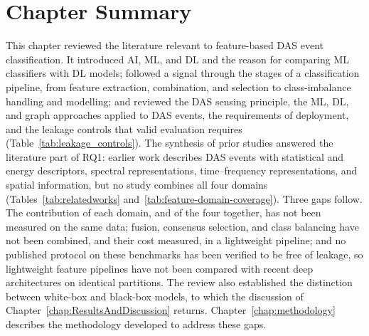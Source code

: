 \section{Chapter Summary}
\label{sec:chap2Summary}
This chapter reviewed the literature relevant to feature-based DAS event classification. It introduced AI, ML, and DL and the reason for comparing ML classifiers with DL models; followed a signal through the stages of a classification pipeline, from feature extraction, combination, and selection to class-imbalance handling and modelling; and reviewed the DAS sensing principle, the ML, DL, and graph approaches applied to DAS events, the requirements of deployment, and the leakage controls that valid evaluation requires (Table~\ref{tab:leakage_controls}). The synthesis of prior studies answered the literature part of RQ1: earlier work describes DAS events with statistical and energy descriptors, spectral representations, time--frequency representations, and spatial information, but no study combines all four domains (Tables~\ref{tab:relatedworks} and~\ref{tab:feature-domain-coverage}). Three gaps follow. The contribution of each domain, and of the four together, has not been measured on the same data; fusion, consensus selection, and class balancing have not been combined, and their cost measured, in a lightweight pipeline; and no published protocol on these benchmarks has been verified to be free of leakage, so lightweight feature pipelines have not been compared with recent deep architectures on identical partitions. The review also established the distinction between white-box and black-box models, to which the discussion of Chapter~\ref{chap:ResultsAndDiscussion} returns. Chapter~\ref{chap:methodology} describes the methodology developed to address these gaps.
